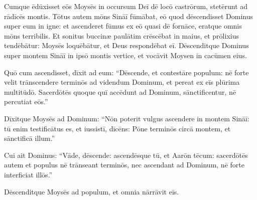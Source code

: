 Cumque ēdūxisset
eōs Moysēs in occursum Deī dē locō castrōrum, stetērunt ad
rādīcēs montis. 
Tōtus autem mōns Sināī
fūmābat, eō quod dēscendisset Dominus super eum in igne:
et ascenderet fūmus ex eō quasi dē fornāce,
eratque omnis mōns terribilis. 
Et sonitus buccinæ
paulātim crēscēbat in maius, et prōlixius
tendēbātur: Moysēs loquēbātur, et Deus respondēbat eī. 
Dēscenditque
Dominus super montem Sināī in ipsō montis vertice, et vocāvit Moysen in
cacūmen eius.

Quō cum ascendisset, 
dīxit ad eum:
``Dēscende, et contestāre populum: nē forte velit
trānscendere terminōs ad videndum Dominum, et
pereat ex eīs plūrima multitūdō. 
Sacerdōtēs quoque quī accēdunt ad
Dominum, sānctificentur, nē percutiat eōs.''

Dīxitque Moysēs ad Dominum:
``Nōn poterit vulgus ascendere in
montem Sināī: tū enim testificātus es, et iussistī, dīcēns:
Pōne terminōs circā montem, et sānctificā illum.''

Cui ait Dominus:
``Vāde, dēscende: as\-cendēsque tū, et Aarōn tēcum: sacerdōtēs autem et
populus nē trānseant terminōs, nec ascendant ad Dominum, nē forte
interficiat illōs.''

Dēscenditque Moysēs ad populum, et omnia nārrāvit
eīs.
